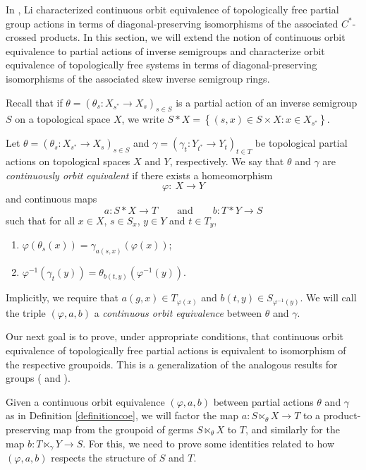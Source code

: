 In \cite{MR3694599}, Li characterized continuous orbit equivalence of topologically free partial group actions in terms of diagonal-preserving isomorphisms of the associated $C^*$-crossed products. In this section, we will extend the notion of continuous orbit equivalence to partial actions of inverse semigroups and characterize orbit equivalence of topologically free systems in terms of diagonal-preserving isomorphisms of the associated skew inverse semigroup rings.

Recall that if $\theta=\left(\theta_s:X_{s^*}\to X_s\right)_{s\in S}$ is a partial action of an inverse semigroup $S$ on a topological space $X$, we write $S\ast X=\left\{(s,x)\in S\times X:x\in X_{s^*}\right\}$.

\begin{definition}\label{definitioncoe}
Let $\theta=\left(\theta_s:X_{s^*}\to X_s\right)_{s\in S}$ and  $\gamma=\left(\gamma_t:Y_{t^*}\to Y_t\right)_{t\in T}$ be topological partial actions on topological spaces $X$ and $Y$, respectively. We say that $\theta$ and $\gamma$ are \emph{continuously orbit equivalent} if there exists a homeomorphism 
\[\varphi: \: X \longrightarrow Y\]
and continuous maps
\[a: S\ast X \longrightarrow T\qquad\text{and}\qquad b: T\ast Y \longrightarrow S\]
such that for all $x\in X$, $s\in S_x$, $y\in Y$ and $t\in T_y$,
\begin{enumerate}%
\item[(i)] $\varphi(\theta_s(x)) = \gamma_{a(s,x)}(\varphi(x))$;
\item[(ii)] $\varphi^{-1}(\gamma_t(y)) = \theta_{b(t,y)}(\varphi^{-1}(y))$.
\end{enumerate}
Implicitly, we require that $a(g,x) \in T_{\varphi(x)}$ and $b(t,y) \in S_{\varphi^{-1}(y)}$. We will call the triple $(\varphi,a,b)$ a \emph{continuous orbit equivalence} between $\theta$ and $\gamma$.
\end{definition}


Our next goal is to prove, under appropriate conditions, that continuous orbit equivalence of topologically free partial actions is equivalent to isomorphism of the respective groupoids. This is a generalization of the analogous results for groups (\cite[Theorem 1.2]{MR3789176} and \cite[Theorem 2.7]{MR3694599}).

Given a continuous orbit equivalence $(\varphi,a,b)$ between partial actions $\theta$ and $\gamma$ as in Definition \ref{definitioncoe}, we will factor the map $a:S\ltimes_\theta X\to T$ to a product-preserving map from the groupoid of germs $S\ltimes_\theta X$ to $T$, and similarly for the map $b:T\ltimes_\gamma Y\to S$. For this, we need to prove some identities related to how $(\varphi,a,b)$ respects the structure of $S$ and $T$.

